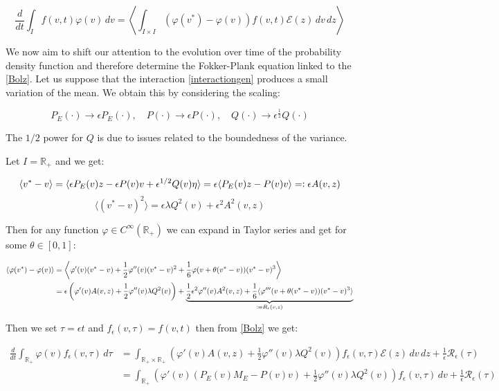 \documentclass[12pt,a4paper]{article}
\numberwithin{theorem}{section}
\numberwithin{definition}{section}
\numberwithin{example}{section}
\numberwithin{exercise}{section}
\newcommand{\R}{\mathbb{R}}
\begin{document}
\begin{equation}\label{Bolz}
    \frac{d}{dt}\int_{I}f(v,t)\varphi(v) \,dv = \left\langle\int_{I\times I}(\varphi(v^{*})-\varphi(v))f(v,t)\mathcal{E}(z) \,dv\,dz\right\rangle
\end{equation}

We now aim to shift our attention to the evolution over time of the probability density function and therefore determine the Fokker-Plank equation linked to the \ref{Bolz}. Let us suppose that the interaction \ref{interactiongen} produces a small variation of the mean. We obtain this by considering the scaling:

\begin{equation}\label{scaling}
    P_E(\cdot)\rightarrow\epsilon P_E(\cdot),\quad P(\cdot)\rightarrow\epsilon P(\cdot),\quad Q(\cdot)\rightarrow\epsilon^{\frac{1}{2}} Q(\cdot)
\end{equation}

The $1/2$ power for $Q$ is due to issues related to the boundedness of the variance.

Let $I=\R_+$ and we get:

\[\langle v^{*}-v\rangle=\langle \epsilon P_E(v)z-\epsilon P(v)v+\epsilon^{1/2}Q(v)\eta\rangle=\epsilon\langle P_E(v)z-P(v)v\rangle =\vcentcolon \epsilon A(v,z)\]
\[\langle (v^{*}-v)^2 \rangle = \epsilon\lambda Q^2(v) + \epsilon^2A^2(v,z)\]

Then for any function $\varphi\in C^{\infty}(\R_+)$ we can expand in Taylor series and get for some $\theta\in[0,1]$:

\begin{align*}
\langle\varphi(v^{*})-\varphi(v)\rangle & = \left\langle \varphi'(v)(v^{*}-v)+\frac{1}{2}\varphi''(v)(v^{*}-v)^2+\frac{1}{6}\varphi(v+\theta(v^{*}-v))(v^{*}-v)^3 \right\rangle \\
& = \epsilon\left(\varphi'(v)A(v,z)+\frac{1}{2}\varphi''(v)\lambda Q^2(v)\right) + \underbrace{\frac{1}{2}\epsilon^2\varphi''(v)A^2(v,z)+\frac{1}{6}\langle\varphi'''(v+\theta(v^{*}-v))(v^{*}-v)^3\rangle}_{\vcentcolon=R_{\epsilon}(v,z)}
\end{align*}

Then we set $\tau=\epsilon t$ and $f_{\epsilon}(v,\tau)=f(v,t)$ then from \ref{Bolz} we get:

\begin{align*}
\frac{d}{dt}\int_{\R_+}\varphi(v)f_{\epsilon}(v,\tau) \,d\tau & = \int_{\R_+\times\R_+} \left(\varphi'(v)A(v,z)+\frac{1}{2}\varphi''(v)\lambda Q^2(v)\right)f_{\epsilon}(v,\tau)\mathcal{E}(z) \,dv\,dz + \frac{1}{\epsilon}\mathcal{R}_{\epsilon}(\tau) \\
& = \int_{\R_+}\left(\varphi'(v)(P_E(v)M_E-P(v)v)+\frac{1}{2}\varphi''(v)\lambda Q^2(v)\right) f_{\epsilon}(v,\tau) \,dv + \frac{1}{\epsilon}\mathcal{R}_{\epsilon}(\tau)
\end{align*}
\end{document}
